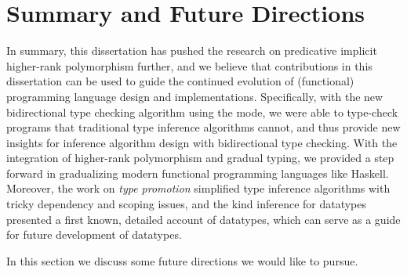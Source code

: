 \chapter{Summary and Future Directions}
\label{chap:future}

In summary, this dissertation has pushed the research
on predicative implicit higher-rank polymorphism further, and we believe that
contributions in this dissertation can be used to guide the continued evolution
of (functional) programming language design and implementations. Specifically,
with the new bidirectional type checking algorithm using the \mode mode, we were
able to type-check programs that traditional type inference algorithms cannot,
and thus provide new insights for inference algorithm design with bidirectional
type checking. With the integration of higher-rank polymorphism and gradual
typing, we provided a step forward in gradualizing modern functional programming
languages like Haskell. Moreover, the work on \textit{type promotion} simplified
type inference algorithms with tricky dependency and scoping issues, and the
kind inference for datatypes presented a first known, detailed account of
datatypes, which can serve as a guide for future development of datatypes.

In this section we discuss some future directions we would like to pursue.




